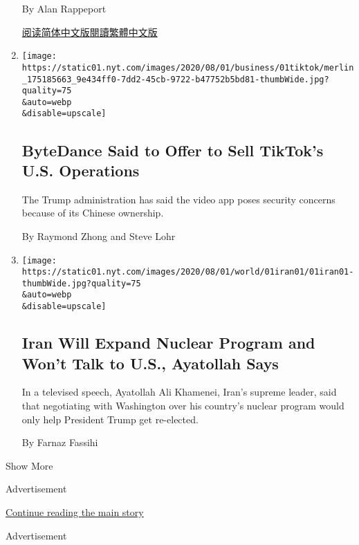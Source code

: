 \begin{enumerate}
  By Alan Rappeport

  \href{https://cn.nytimes.com/usa/20200803/virus-china-ppp-small-business-loans/}{阅读简体中文版}\href{https://cn.nytimes.com/usa/20200803/virus-china-ppp-small-business-loans/zh-hant/}{閱讀繁體中文版}
\item
  \href{/2020/08/01/technology/tiktok-sale-trump-ban.html}{}

  \texttt{[image: https://static01.nyt.com/images/2020/08/01/business/01tiktok/merlin\_175185663\_9e434ff0-7dd2-45cb-9722-b47752b5bd81-thumbWide.jpg?quality=75\\\&auto=webp\\\&disable=upscale]}

  \hypertarget{bytedance-said-to-offer-to-sell-tiktoks-us-operations}{%
  \subsection{ByteDance Said to Offer to Sell TikTok's U.S.
  Operations}\label{bytedance-said-to-offer-to-sell-tiktoks-us-operations}}

  The Trump administration has said the video app poses security
  concerns because of its Chinese ownership.

  By Raymond Zhong and Steve Lohr
\item
  \href{/2020/08/01/world/asia/iran-khamenei-us-sanctions.html}{}

  \texttt{[image: https://static01.nyt.com/images/2020/08/01/world/01iran01/01iran01-thumbWide.jpg?quality=75\\\&auto=webp\\\&disable=upscale]}

  \hypertarget{iran-will-expand-nuclear-program-and-wont-talk-to-us-ayatollah-says}{%
  \subsection{Iran Will Expand Nuclear Program and Won't Talk to U.S.,
  Ayatollah
  Says}\label{iran-will-expand-nuclear-program-and-wont-talk-to-us-ayatollah-says}}

  In a televised speech, Ayatollah Ali Khamenei, Iran's supreme leader,
  said that negotiating with Washington over his country's nuclear
  program would only help President Trump get re-elected.

  By Farnaz Fassihi
\end{enumerate}

Show More

Advertisement

\protect\hyperlink{after-mid1}{Continue reading the main story}

Advertisement

